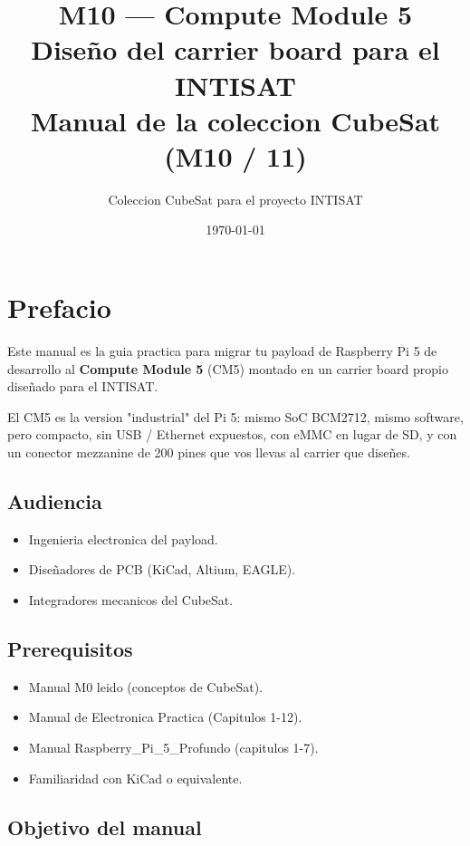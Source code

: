 \documentclass[11pt,a4paper,oneside,openright]{book}
\title{\Huge\bfseries M10 --- Compute Module 5\\[0.4em]
\Large Diseño del carrier board para el INTISAT\\[0.6em]
\large Manual de la coleccion CubeSat (M10 / 11)}
\author{Coleccion CubeSat para el proyecto INTISAT}
\date{\today}
\begin{document}
\frontmatter
\maketitle

\chapter*{Prefacio}

Este manual es la guia practica para migrar tu payload de Raspberry Pi 5
de desarrollo al \textbf{Compute Module 5} (CM5) montado en un carrier
board propio diseñado para el INTISAT.

El CM5 es la version "industrial" del Pi 5: mismo SoC BCM2712, mismo
software, pero compacto, sin USB / Ethernet expuestos, con eMMC en lugar
de SD, y con un conector mezzanine de 200 pines que vos llevas al
carrier que diseñes.

\section*{Audiencia}

\begin{itemize}[leftmargin=2em]
  \item Ingenieria electronica del payload.
  \item Diseñadores de PCB (KiCad, Altium, EAGLE).
  \item Integradores mecanicos del CubeSat.
\end{itemize}

\section*{Prerequisitos}

\begin{itemize}[leftmargin=2em]
  \item Manual M0 leido (conceptos de CubeSat).
  \item Manual de Electronica Practica (Capitulos 1-12).
  \item Manual Raspberry\_Pi\_5\_Profundo (capitulos 1-7).
  \item Familiaridad con KiCad o equivalente.
\end{itemize}

\section*{Objetivo del manual}
\end{document}
